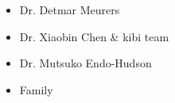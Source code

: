 

\pagestyle{empty}  %
\begin{itemize}
    \item Dr. Detmar Meurers
    \item Dr. Xiaobin Chen & kibi team
    \item Dr. Mutsuko Endo-Hudson
    \item Family
\end{itemize}
